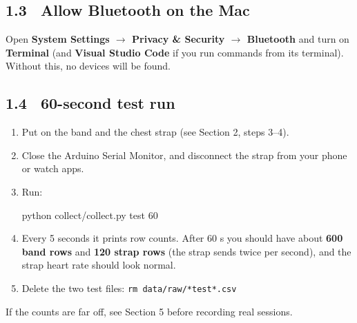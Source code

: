\documentclass[11pt]{article}
\newcommand{\cmd}[1]{\par\smallskip\colorbox{black!6}{\parbox{\dimexpr\linewidth-2\fboxsep}{\ttfamily\small #1}}\par\smallskip}
\begin{document}
\subsection*{1.3 \ Allow Bluetooth on the Mac}
Open \textbf{System Settings $\to$ Privacy \& Security $\to$ Bluetooth} and turn on \textbf{Terminal} (and
\textbf{Visual Studio Code} if you run commands from its terminal). Without this, no devices will be found.

\subsection*{1.4 \ 60-second test run}
\begin{enumerate}[label=\arabic*.]
  \item Put on the band and the chest strap (see Section 2, steps 3--4).
  \item Close the Arduino Serial Monitor, and disconnect the strap from your phone or watch apps.
  \item Run:
  \cmd{python collect/collect.py test 60}
  \item Every 5 seconds it prints row counts. After 60 s you should have about \textbf{600 band rows} and
        \textbf{120 strap rows} (the strap sends twice per second), and the strap heart rate should look normal.
  \item Delete the two test files: \texttt{rm data/raw/*test*.csv}
\end{enumerate}
If the counts are far off, see Section 5 before recording real sessions.
\end{document}
